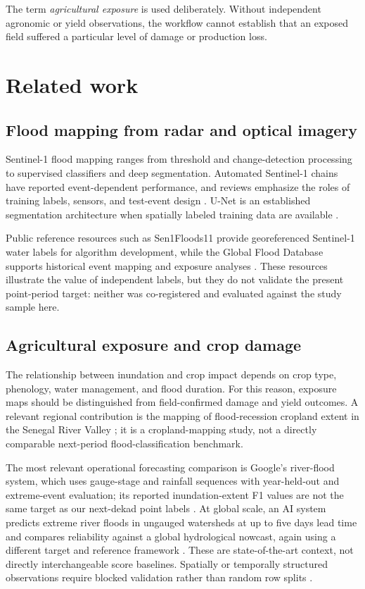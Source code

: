 \documentclass[pdflatex,sn-mathphys,Numbered]{sn-jnl}
\begin{document}
The term \emph{agricultural exposure} is used deliberately. Without independent agronomic or yield observations, the workflow cannot establish that an exposed field suffered a particular level of damage or production loss.

\section{Related work}
\subsection{Flood mapping from radar and optical imagery}
Sentinel-1 flood mapping ranges from threshold and change-detection processing to supervised classifiers and deep segmentation. Automated Sentinel-1 chains have reported event-dependent performance, and reviews emphasize the roles of training labels, sensors, and test-event design \cite{twele2016,bioresita2018,bentivoglio2022}. U-Net is an established segmentation architecture when spatially labeled training data are available \cite{ronneberger2015}.

Public reference resources such as Sen1Floods11 provide georeferenced Sentinel-1 water labels for algorithm development, while the Global Flood Database supports historical event mapping and exposure analyses \cite{bonafilia2020,tellman2021}. These resources illustrate the value of independent labels, but they do not validate the present point-period target: neither was co-registered and evaluated against the study sample here.

\subsection{Agricultural exposure and crop damage}
The relationship between inundation and crop impact depends on crop type, phenology, water management, and flood duration. For this reason, exposure maps should be distinguished from field-confirmed damage and yield outcomes. A relevant regional contribution is the mapping of flood-recession cropland extent in the Senegal River Valley \cite{bruckmann2025}; it is a cropland-mapping study, not a directly comparable next-period flood-classification benchmark.

The most relevant operational forecasting comparison is Google's river-flood system, which uses gauge-stage and rainfall sequences with year-held-out and extreme-event evaluation; its reported inundation-extent F1 values are not the same target as our next-dekad point labels \cite{nevo2022}. At global scale, an AI system predicts extreme river floods in ungauged watersheds at up to five days lead time and compares reliability against a global hydrological nowcast, again using a different target and reference framework \cite{nearing2024}. These are state-of-the-art context, not directly interchangeable score baselines. Spatially or temporally structured observations require blocked validation rather than random row splits \cite{roberts2017}.
\end{document}
